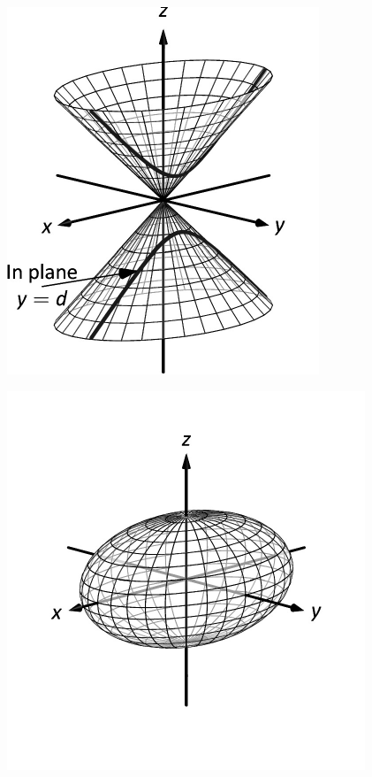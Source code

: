 \documentclass[10pt]{article}
\begin{document}
\includegraphics{figquadric_conec_3DBW.pdf}
\texttt{}

\includegraphics{figquadric_ellipsoid_3DBW.pdf}
\texttt{}
\end{document}
